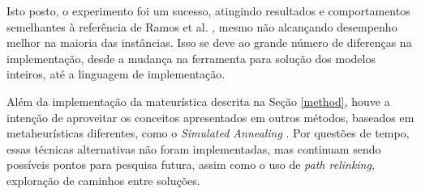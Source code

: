\documentclass{MO824}
\begin{document}
    Isto posto, o experimento foi um sucesso, atingindo resultados e comportamentos semelhantes à referência de Ramos et al. \cite{natanael}, mesmo não alcançando desempenho melhor na maioria das instâncias. Isso se deve ao grande número de diferenças na implementação, desde a mudança na ferramenta para solução dos modelos inteiros, até a linguagem de implementação.
    
    Além da implementação da mateurística descrita na Seção \ref{method}, houve a intenção de aproveitar os conceitos apresentados em outros métodos, baseados em metaheurísticas diferentes, como o \textit{Simulated Annealing} \cite{nat_dissertation}. Por questões de tempo, essas técnicas alternativas não foram implementadas, mas continuam sendo possíveis pontos para pesquisa futura, assim como o uso de \textit{path relinking}, exploração de caminhos entre soluções.


\small
\end{document}
